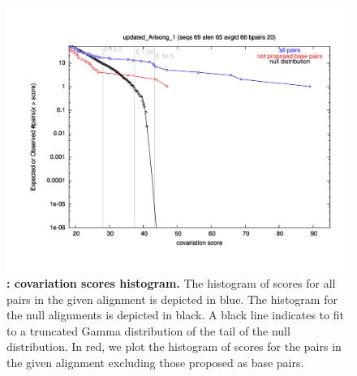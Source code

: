 \begin{figure}
  \includegraphics[scale=0.50]{Arisong_his.pdf} 
\caption{\small\textbf{:
    covariation scores histogram.}  The histogram of scores for all
  pairs in the given alignment is depicted in blue. The histogram for
  the null alignments is depicted in black. A black line indicates to
  fit to a truncated Gamma distribution of the tail of the null
  distribution. In red, we plot the histogram of scores for the pairs
  in the given alignment excluding those proposed as base pairs.}
\label{fig:histogram}
\end{figure}


